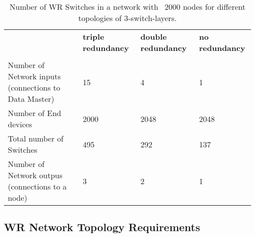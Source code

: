 \begin{table}[ht]
\caption{Number of WR Switches in a network with ~2000 nodes for different
topologies of 3-switch-layers.} 
\centering 
\begin{tabular}{| p{6cm} | p{2.0cm} | p{2.0cm} | p{2.0cm} | }       
\hline
 & \textbf{triple redundancy}&\textbf{double redundancy}  &\textbf{no
redundancy} \\
      &  &  &    \\ \hline
Number of Network inputs 
(connections to Data Master) & 15& 4           & 1               \\ \hline
Number of End devices  & 2000    & 2048        & 2048            \\ \hline
Total number of Switches     & 495     & 292         & 137                 \\
\hline
Number of Network outpus 
(connections to a node) & 3        & 2           & 1               \\ \hline

\end{tabular}
\label{tab:2000nodes3topologies}
\end{table}

\newpage

\subsection{WR Network Topology Requirements} 

